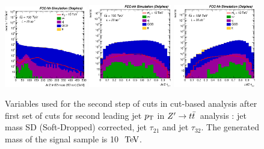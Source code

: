 \documentclass{cernrep}
\newcommand*{\zptt}{\ensuremath{Z^{\prime} \rightarrow \ttbar}}
\begin{document}
\begin{figure}[!htb]\centering
\includegraphics[width=0.32\textwidth]{Fig/Zptt/Jet2_trk02_SD_Cor_m_sel1_nostack_log.eps}
\includegraphics[width=0.32\textwidth]{Fig/Zptt/Jet2_tau21_sel1_nostack_log.eps}
\includegraphics[width=0.32\textwidth]{Fig/Zptt/Jet2_tau32_sel1_nostack_log.eps}
\caption{Variables used for the second step of cuts in cut-based analysis after first set of cuts for second leading jet $p\sb{\scriptstyle\mathrm{T}}$ in \zptt\ analysis : jet mass SD (Soft-Dropped) corrected, jet $\tau_{21}$ and jet $\tau_{32}$. The generated mass of the signal sample is 10 $\TeV$.}
\label{fig:Zptt_sel1_cut}
\end{figure}
\end{document}
